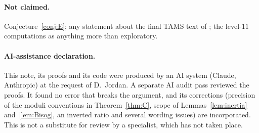 \documentclass[11pt,a4paper]{article}
\numberwithin{equation}{section}
\theoremstyle{definition}
\theoremstyle{remark}
\begin{document}
\paragraph{Not claimed.} Conjecture~\ref{conj:E}; any statement about the final TAMS text of
\citet{BLtams}; the level-$11$ computations as anything more than exploratory.

\paragraph{AI-assistance declaration.} This note, its proofs and its code were produced by an AI system
(Claude, Anthropic) at the request of D.~Jordan. A separate AI audit pass reviewed the proofs. It found no error that
breaks the argument, and its corrections (precision of the moduli conventions in Theorem~\ref{thm:C}, scope of
Lemmas~\ref{lem:inertia} and~\ref{lem:Bisog}, an inverted ratio and several wording issues) are incorporated. This is not a
substitute for review by a specialist, which has not taken place.
\end{document}
